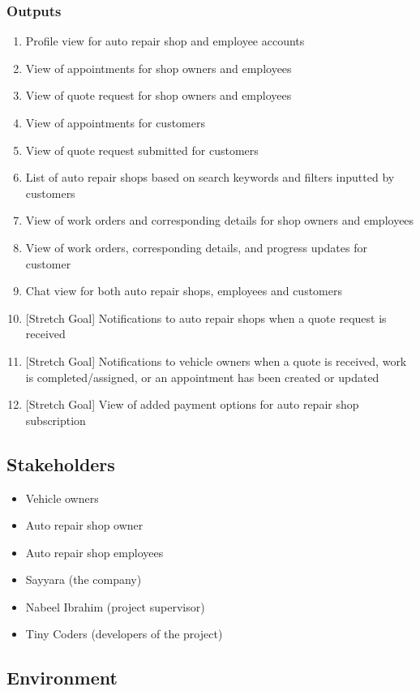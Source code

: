 \documentclass{article}
\begin{document}
\subsubsection{Outputs}
\begin{enumerate}
	\item Profile view for auto repair shop and employee accounts
	\item View of appointments for shop owners and employees
	\item View of quote request for shop owners and employees
	\item View of appointments for customers
	\item View of quote request submitted for customers
	\item List of auto repair shops based on search keywords and filters inputted by customers
	\item View of work orders and corresponding details for shop owners and employees
	\item View of work orders, corresponding details, and progress updates for customer
	\item Chat view for both auto repair shops, employees and customers
	\item {[Stretch Goal]} Notifications to auto repair shops when a quote request is received
	\item {[Stretch Goal]} Notifications to vehicle owners when a quote is received, work is completed/assigned,
	      or an appointment has been created or updated
	\item {[Stretch Goal]} View of added payment options for auto repair shop subscription
\end{enumerate}

\subsection{Stakeholders}
\begin{itemize}
	\item Vehicle owners
	\item Auto repair shop owner
	\item Auto repair shop employees
	\item Sayyara (the company)
	\item Nabeel Ibrahim (project supervisor)
	\item Tiny Coders (developers of the project)
\end{itemize}

\subsection{Environment}
\end{document}
